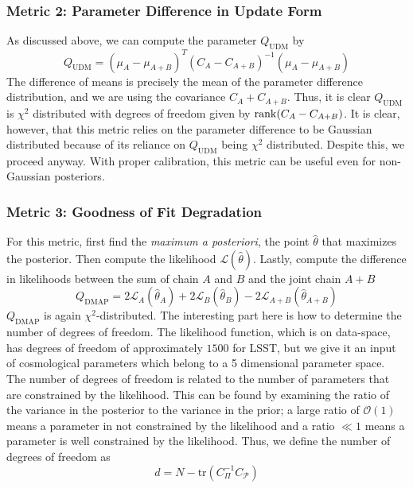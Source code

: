 \subsubsection{Metric 2: Parameter Difference in Update Form}
As discussed above, we can compute the parameter $Q_{\mathrm{UDM}}$ by
\begin{equation}
    Q_{\mathrm{UDM}} = {(\mu_A - \mu_{A+B})}^T{(C_A-C_{A+B})}^{-1}(\mu_A - \mu_{A+B}) 
\end{equation}
The difference of means is precisely the mean of the parameter difference distribution, and we are using the covariance $C_A+C_{A+B}$.
Thus, it is clear $Q_{\mathrm{UDM}}$ is $\chi^2$ distributed with degrees of freedom given by $\rank(C_A-C_{A+B})$. 
It is clear, however, that this metric relies on the parameter difference to be Gaussian distributed because of its reliance on $Q_{\mathrm{UDM}}$ being $\chi^2$ distributed. Despite this, we proceed anyway. With proper calibration, this metric can be useful even for non-Gaussian posteriors.

\subsubsection{Metric 3: Goodness of Fit Degradation}
For this metric, first find the \textit{maximum a posteriori}, the point $\hat\theta$ that maximizes the posterior. Then compute the likelihood $\mathcal{L}(\hat\theta)$. Lastly, compute the difference in likelihoods between the sum of chain $A$ and $B$ and the joint chain $A+B$
\begin{equation}
	Q_{\mathrm{DMAP}} = 2\mathcal{L}_A(\hat\theta_A) + 2\mathcal{L}_B(\hat\theta_B) - 2\mathcal{L}_{A+B}(\hat\theta_{A+B})
\end{equation}
$Q_{\mathrm{DMAP}}$ is again $\chi^2$-distributed. The interesting part here is how to determine the number of degrees of freedom. The likelihood function, which is on data-space, has degrees of freedom of approximately $1500$ for LSST, but we give it an input of cosmological parameters which belong to a 5 dimensional parameter space. The number of degrees of freedom is related to the number of parameters that are constrained by the likelihood. This can be found by examining the ratio of the variance in the posterior to the variance in the prior; a large ratio of $\mathcal{O}(1)$ means a parameter in not constrained by the likelihood and a ratio $\ll 1$ means a parameter is well constrained by the likelihood. Thus, we define the number of degrees of freedom as
\begin{equation}
	d = N-\mathrm{tr}(C_\Pi^{-1}C_\mathcal{P})
\end{equation}

